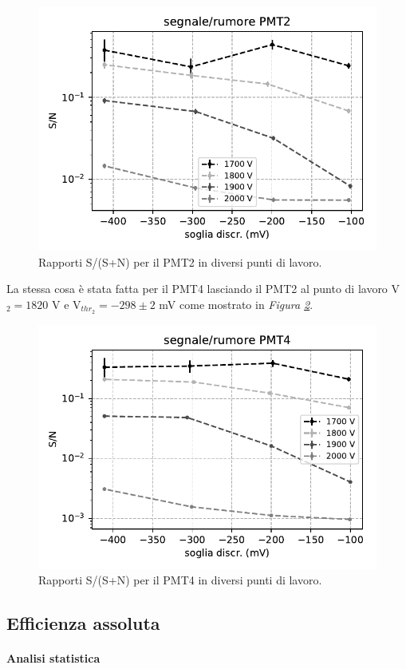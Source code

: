 \documentclass[a4paper]{article}
\begin{document}
\begin{figure}[h]
\centering
\includegraphics[width=8 cm]{calib_pmt2}
\caption{Rapporti S/(S+N) per il PMT2 in diversi punti di lavoro.}
\label{test1}
\end{figure}

La stessa cosa è stata fatta per il PMT4 lasciando il PMT2 al punto di lavoro V$_2=1820$\! V e V$_{thr_2}=-298\pm2$\! mV come mostrato in \emph{Figura \ref{test2}}.

\begin{figure}[h]
\centering
\includegraphics[width=8 cm]{calib_pmt4}
\caption{Rapporti S/(S+N) per il PMT4 in diversi punti di lavoro.}
\label{test2}
\end{figure}

\subsection*{Efficienza assoluta}

%

\paragraph{Analisi statistica}
\end{document}
